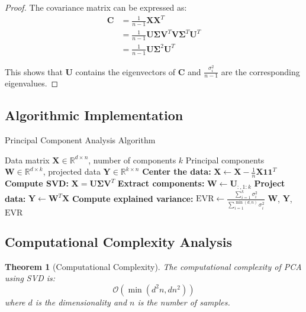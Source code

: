 \documentclass[12pt]{article}
\renewcommand{\vec}[1]{\mathbf{#1}}
\newtheorem{theorem}{Theorem}[section]
\begin{document}
\begin{proof}
    The covariance matrix can be expressed as:
    \begin{align}
        \vec{C} & = \frac{1}{n-1}\vec{X}\vec{X}^T                                           \\
                & = \frac{1}{n-1}\vec{U}\vec{\Sigma}\vec{V}^T\vec{V}\vec{\Sigma}^T\vec{U}^T \\
                & = \frac{1}{n-1}\vec{U}\vec{\Sigma}^2\vec{U}^T
    \end{align}

    This shows that $\vec{U}$ contains the eigenvectors of $\vec{C}$ and $\frac{\sigma_i^2}{n-1}$ are the corresponding eigenvalues.
\end{proof}

\subsection{Algorithmic Implementation}

\begin{algorithm}[H]
    \caption{Principal Component Analysis Algorithm}
    \begin{algorithmic}[1]
        \REQUIRE Data matrix $\vec{X} \in \mathbb{R}^{d \times n}$, number of components $k$
        \ENSURE Principal components $\vec{W} \in \mathbb{R}^{d \times k}$, projected data $\vec{Y} \in \mathbb{R}^{k \times n}$
        \STATE \textbf{Center the data:} $\vec{X} \leftarrow \vec{X} - \frac{1}{n}\vec{X}\vec{1}\vec{1}^T$
        \STATE \textbf{Compute SVD:} $\vec{X} = \vec{U}\vec{\Sigma}\vec{V}^T$
        \STATE \textbf{Extract components:} $\vec{W} \leftarrow \vec{U}_{:,1:k}$
        \STATE \textbf{Project data:} $\vec{Y} \leftarrow \vec{W}^T\vec{X}$
        \STATE \textbf{Compute explained variance:} $\text{EVR} \leftarrow \frac{\sum_{i=1}^k \sigma_i^2}{\sum_{i=1}^{\min(d,n)} \sigma_i^2}$
        \RETURN $\vec{W}$, $\vec{Y}$, $\text{EVR}$
    \end{algorithmic}
\end{algorithm}

\subsection{Computational Complexity Analysis}

\begin{theorem}[Computational Complexity]
    The computational complexity of PCA using SVD is:
    \begin{equation}
        \mathcal{O}(\min(d^2n, dn^2))
    \end{equation}
    where $d$ is the dimensionality and $n$ is the number of samples.
\end{theorem}
\end{document}

